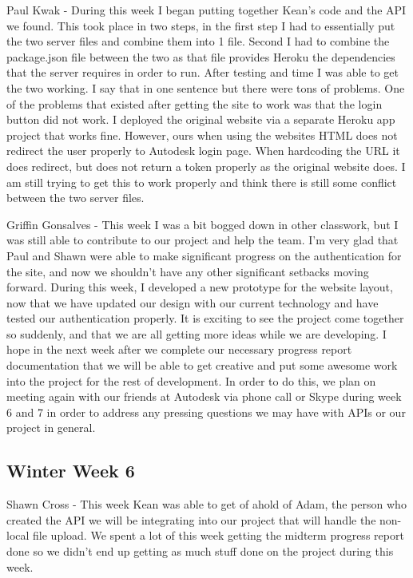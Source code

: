 \documentclass[10pt,draftclsnofoot,onecolumn]{IEEEtran}
\begin{document}
Paul Kwak - During this week I began putting together Kean's code and the API we found. This took place in two steps, in the first step I had to essentially put the two server files and combine them into 1 file. Second I had to combine the package.json file between the two as that file provides Heroku the dependencies that the server requires in order to run. After testing and time I was able to get the two working. I say that in one sentence but there were tons of problems. One of the problems that existed after getting the site to work was that the login button did not work. I deployed the original website via a separate Heroku app project that works fine. However, ours when using the websites HTML does not redirect the user properly to Autodesk login page. When hardcoding the URL it does redirect, but does not return a token properly as the original website does. I am still trying to get this to work properly and think there is still some conflict between the two server files.

Griffin Gonsalves - This week I was a bit bogged down in other classwork, but I was still able to contribute to our project and help the team. I'm very glad that Paul and Shawn were able to make significant progress on the authentication for the site, and now we shouldn't have any other significant setbacks moving forward. During this week, I developed a new prototype for the website layout, now that we have updated our design with our current technology and have tested our authentication properly. It is exciting to see the project come together so suddenly, and that we are all getting more ideas while we are developing. I hope in the next week after we complete our necessary progress report documentation that we will be able to get creative and put some awesome work into the project for the rest of development. In order to do this, we plan on meeting again with our friends at Autodesk via phone call or Skype during week 6 and 7 in order to address any pressing questions we may have with APIs or our project in general.

\subsection{Winter Week 6}
Shawn Cross - This week Kean was able to get of ahold of Adam, the person who created the API we will be integrating into our project that will handle the non-local file upload. We spent a lot of this week getting the midterm progress report done so we didn't end up getting as much stuff done on the project during this week. 
\end{document}
